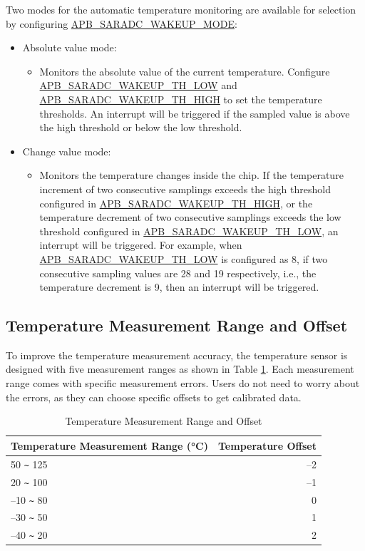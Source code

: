 \documentclass[main\_\_EN.tex]{subfiles}
\begin{document}
Two modes for the automatic temperature monitoring are available for selection by configuring \hyperref[fielddesc:APBSARADCWAKEUPMODE]{APB\_SARADC\_WAKEUP\_MODE}:

   \begin{itemize}
       \item Absolute value mode:
           \begin{itemize}
                \item Monitors the absolute value of the current temperature. Configure \hyperref[fielddesc:APBSARADCWAKEUPTHLOW]{APB\_SARADC\_WAKEUP\_TH\_LOW} and \hyperref[fielddesc:APBSARADCWAKEUPTHHIGH]{APB\_SARADC\_WAKEUP\_TH\_HIGH} to set the temperature thresholds. An interrupt will be triggered if the sampled value is above the high threshold or below the low threshold.
           \end{itemize}
       \item Change value mode:
            \begin{itemize}
                \item Monitors the temperature changes inside the chip. If the temperature increment of two consecutive samplings exceeds the high threshold configured in \hyperref[fielddesc:APBSARADCWAKEUPTHHIGH]{APB\_SARADC\_WAKEUP\_TH\_HIGH}, or the temperature decrement of two consecutive samplings exceeds the low threshold configured in \hyperref[fielddesc:APBSARADCWAKEUPTHLOW]{APB\_SARADC\_WAKEUP\_TH\_LOW}, an interrupt will be triggered. For example, when \hyperref[fielddesc:APBSARADCWAKEUPTHLOW]{APB\_SARADC\_WAKEUP\_TH\_LOW} is configured as 8, if two consecutive sampling values are 28 and 19 respectively, i.e., the temperature decrement is 9, then an interrupt will be triggered.
            \end{itemize}
    \end{itemize}

\subsection{Temperature Measurement Range and Offset}

To improve the temperature measurement accuracy, the temperature sensor is designed with five measurement ranges as shown in Table \ref{tab:tsensor-dac}. Each measurement range comes with specific measurement errors. Users do not need to worry about the errors, as they can choose specific offsets to get calibrated data.

\begin{longtable}[c]{|l|r|}
    \caption{Temperature Measurement Range and Offset}
    \label{tab:tsensor-dac}
    \\\hline
    \rowcolor{lightgray}
    Temperature Measurement Range (°C)   & Temperature Offset \\\hline
    50 \verb+~+ 125 &  –2 \\\hline
    20 \verb+~+ 100 &  –1 \\\hline
    –10 \verb+~+ 80 &  0 \\\hline
    –30 \verb+~+ 50 &  1 \\\hline
    –40 \verb+~+ 20 &  2 \\\hline
\end{longtable}
\end{document}

